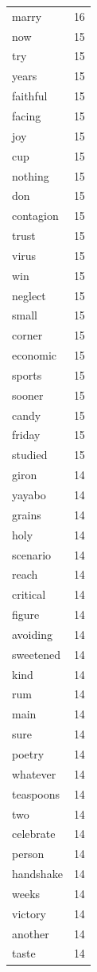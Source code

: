 \begin{tabular}{lr}
marry & 16 \\
now & 15 \\
try & 15 \\
years & 15 \\
faithful & 15 \\
facing & 15 \\
joy & 15 \\
cup & 15 \\
nothing & 15 \\
don & 15 \\
contagion & 15 \\
trust & 15 \\
virus & 15 \\
win & 15 \\
neglect & 15 \\
small & 15 \\
corner & 15 \\
economic & 15 \\
sports & 15 \\
sooner & 15 \\
candy & 15 \\
friday & 15 \\
studied & 15 \\
giron & 14 \\
yayabo & 14 \\
grains & 14 \\
holy & 14 \\
scenario & 14 \\
reach & 14 \\
critical & 14 \\
figure & 14 \\
avoiding & 14 \\
sweetened & 14 \\
kind & 14 \\
rum & 14 \\
main & 14 \\
sure & 14 \\
poetry & 14 \\
whatever & 14 \\
teaspoons & 14 \\
two & 14 \\
celebrate & 14 \\
person & 14 \\
handshake & 14 \\
weeks & 14 \\
victory & 14 \\
another & 14 \\
taste & 14 \\

\end{tabular}
